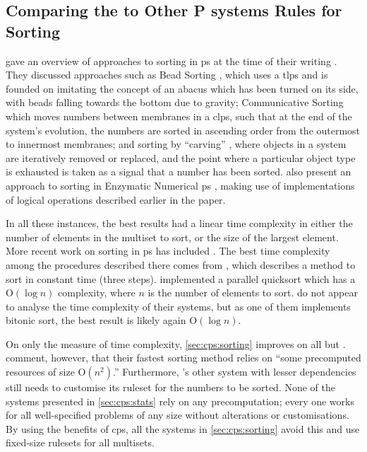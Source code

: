 \subsection{Comparing the   to Other P systems Rules for Sorting}

\citeauthor{Ceterchi2010} gave an overview of approaches to sorting in \gls{ps} at the time of their writing \cite{Ceterchi2010}.  They discussed approaches such as Bead Sorting \cite{Arulanandham2002}, which uses a \gls{tlps} and is founded on imitating the concept of an abacus which has been turned on its side, with beads falling towards the bottom due to gravity; Communicative Sorting \cite[Sec. 5.2]{Alhazov2007} which moves numbers between membranes in a \gls{clps}, such that at the end of the system's evolution, the numbers are sorted in ascending order from the outermost to innermost membranes; and sorting by ``carving'' \cite{Alhazov2007}, where objects in a system are iteratively removed or replaced, and the point where a particular object type is exhausted is taken as a signal that a number has been sorted.  \citeauthor{Maeda2014} also present an approach to sorting in Enzymatic Numerical \gls{ps} \cite{Maeda2014}, making use of implementations of logical operations described earlier in the paper.

In all these instances, the best results had a linear time complexity in either the number of elements in the multiset to sort, or the size of the largest element.  More recent work on sorting in \gls{ps} has included \cite{Gheorghe2017,Metta2015,Yan2019}.  The best time complexity among the procedures described there comes from \cite[Sec. 3.3]{Gheorghe2017}, which describes a method to sort in constant time (three steps).  \citeauthor{Yan2019} \cite{Yan2019} implemented a parallel quicksort which has a O\((\log n)\) complexity, where \(n\) is the number of elements to sort.  \citeauthor{Metta2015} \cite{Metta2015} do not appear to analyse the time complexity of their systems, but as one of them implements bitonic sort, the best result is likely again O\((\log n)\).

On only the measure of time complexity, \cref{sec:cps:sorting} improves on all but \cite{Gheorghe2017}.  \citeauthor{Gheorghe2017} comment, however, that their fastest sorting method relies on ``some precomputed resources of size O\((n^2)\).''  Furthermore, \cite{Gheorghe2017}'s other system with lesser dependencies still needs to customise its \gls{ruleset} for the numbers to be sorted.  None of the systems presented in \cref{sec:cps:stats} rely on any precomputation; every one works for all well-specified problems of any size without alterations or customisations.  By using the benefits of \gls{cps}, all the systems in \cref{sec:cps:sorting} avoid this and use fixed-size \glspl{ruleset} for all multisets.

